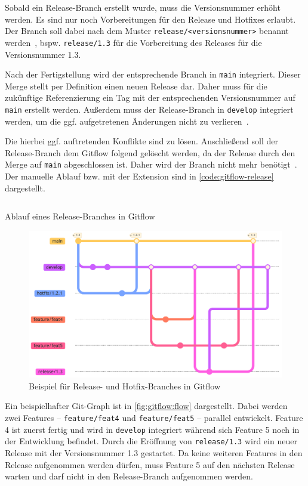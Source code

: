 Sobald ein Release\hyp Branch erstellt wurde, muss die Versionsnummer erhöht werden. Es sind nur noch Vorbereitungen für den Release und Hotfixes erlaubt. Der Branch soll dabei nach dem Muster \texttt{release/<versionsnummer>} benannt werden~\cite{driessenSuccessfulGitBranching2010}, bspw. \texttt{release/1.3} für die Vorbereitung des Releases für die Versionsnummer 1.3.

Nach der Fertigstellung wird der entsprechende Branch in \texttt{main} integriert. Dieser Merge stellt per Definition einen neuen Release dar. Daher muss für die zukünftige Referenzierung ein Tag mit der entsprechenden Versionsnummer auf \texttt{main} erstellt werden. Außerdem muss der Release-Branch in \texttt{develop} integriert werden, um die ggf. aufgetretenen Änderungen nicht zu verlieren~\cite{driessenSuccessfulGitBranching2010}.

Die hierbei ggf. auftretenden Konflikte sind zu lösen. Anschließend soll der Release-Branch dem Gitflow folgend gelöscht werden, da der Release durch den Merge auf \texttt{main} abgeschlossen ist. Daher wird der Branch nicht mehr benötigt~\cite{driessenSuccessfulGitBranching2010}. Der manuelle Ablauf bzw. mit der Extension sind in \autoref{code:gitflow-release} dargestellt.

\begin{listing}
    \inputminted[breaklines]{shell}{src/assets/code/gitflow/gitflow_release.sh}
    \caption{Ablauf eines Release\hyp Branches in Gitflow}
    \label{code:gitflow-release}
\end{listing}

\begin{figure}
    \includegraphics[width=0.7\linewidth]{src/assets/diagrams/gitflow/flow.pdf}
    \caption{Beispiel für Release- und Hotfix\hyp Branches in Gitflow}
    \label{fig:gitflow:flow}
    \Description{}
\end{figure}

Ein beispielhafter Git\hyp Graph ist in \autoref{fig:gitflow:flow} dargestellt. Dabei werden zwei Features -- \texttt{feature/feat4} und \texttt{feature/feat5} -- parallel entwickelt. Feature 4 ist zuerst fertig und wird in \texttt{develop} integriert während sich Feature 5 noch in der Entwicklung befindet. Durch die Eröffnung von \texttt{release/1.3} wird ein neuer Release mit der Versionsnummer 1.3 gestartet. Da keine weiteren Features in den Release aufgenommen werden dürfen, muss Feature 5 auf den nächsten Release warten und darf nicht in den Release\hyp Branch aufgenommen werden.

